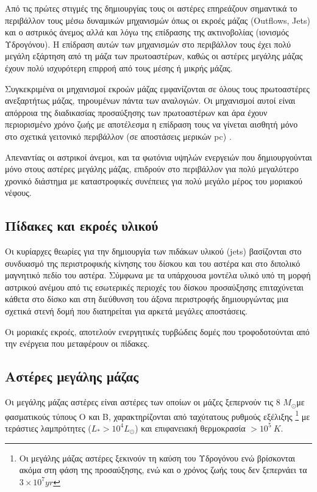 \documentclass[a4paper,12pt]{memoir}
\newcommand{\sm}{$M_{\odot}$}
\begin{document}
Από τις πρώτες στιγμές της δημιουργίας τους οι αστέρες επηρεάζουν σημαντικά το περιβάλλον τους μέσω δυναμικών μηχανισμών όπως οι εκροές μάζας (Outflows, Jets) και ο αστρικός άνεμος αλλά και λόγω της επίδρασης της ακτινοβολίας (ιονισμός Υδρογόνου). Η επίδραση αυτών των μηχανισμών στο περιβάλλον τους έχει πολύ μεγάλη εξάρτηση από τη μάζα των πρωτοαστέρων, καθώς οι αστέρες μεγάλης μάζας έχουν πολύ ισχυρότερη επιρροή από τους μέσης ή μικρής μάζας.

Συγκεκριμένα οι μηχανισμοί εκροών μάζας εμφανίζονται σε όλους τους πρωτοαστέρες ανεξαρτήτως μάζας, τηρουμένων πάντα των αναλογιών. Οι μηχανισμοί αυτοί είναι απόρροια της διαδικασίας προσαύξησης των πρωτοαστέρων και άρα έχουν περιορισμένο χρόνο ζωής με αποτέλεσμα η επίδραση τους να γίνεται αισθητή μόνο στο σχετικά γειτονικό περιβάλλον (σε αποστάσεις μερικών pc) \cite{Yildiz_2015}. 

Απεναντίας οι αστρικοί άνεμοι, και τα φωτόνια υψηλών ενεργειών που δημιουργούνται μόνο στους αστέρες μεγάλης μάζας, επιδρούν στο περιβάλλον για πολύ μεγαλύτερο χρονικό διάστημα με καταστροφικές συνέπειες για πολύ μεγάλο μέρος του μοριακού νέφους.


\subsection{Πίδακες και εκροές υλικού}
Οι κυρίαρχες θεωρίες για την δημιουργία των πιδάκων υλικού (jets) βασίζονται στο συνδυασμό της περιστροφικής κίνησης του δίσκου και του αστέρα και στο διπολικό μαγνητικό πεδίο του αστέρα. 
Σύμφωνα με τα υπάρχουσα μοντέλα υλικό υπό τη μορφή αστρικού ανέμου από τις εσωτερικές περιοχές του δίσκου προσαύξησης επιταχύνεται κάθετα στο δίσκο και στη διεύθυνση του άξονα περιστροφής δημιουργώντας μια σχετικά στενή δομή που διατηρείται για αρκετά μεγάλες αποστάσεις.

Οι μοριακές εκροές, αποτελούν ενεργητικές τυρβώδεις δομές που τροφοδοτούνται από την ενέργεια που μεταφέρουν οι πίδακες.   


\subsection{Αστέρες μεγάλης μάζας}
Οι μεγάλης μάζας αστέρες είναι αστέρες των οποίων οι μάζες ξεπερνούν τις 8 \sm με φασματικούς τύπους O και B, χαρακτηρίζονται από ταχύτατους ρυθμούς εξέλιξης \footnote{Οι μεγάλης μάζας αστέρες ξεκινούν τη καύση του Υδρογόνου ενώ βρίσκονται ακόμα στη φάση της προσαύξησης, ενώ και ο χρόνος ζωής τους δεν ξεπερνάει τα $3 \times 10 ^7 yr$} με τεράστιες λαμπρότητες ($L_* > 10^4 L _ \odot$) και επιφανειακή θερμοκρασία $>10 ^5 \ K$.
\end{document}
